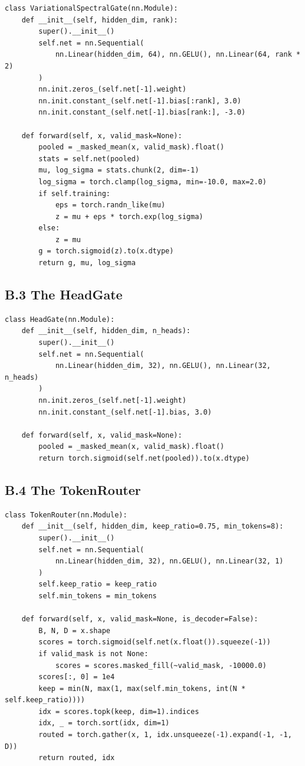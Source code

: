 \begin{lstlisting}
class VariationalSpectralGate(nn.Module):
    def __init__(self, hidden_dim, rank):
        super().__init__()
        self.net = nn.Sequential(
            nn.Linear(hidden_dim, 64), nn.GELU(), nn.Linear(64, rank * 2)
        )
        nn.init.zeros_(self.net[-1].weight)
        nn.init.constant_(self.net[-1].bias[:rank], 3.0)
        nn.init.constant_(self.net[-1].bias[rank:], -3.0)
    
    def forward(self, x, valid_mask=None):
        pooled = _masked_mean(x, valid_mask).float()
        stats = self.net(pooled)
        mu, log_sigma = stats.chunk(2, dim=-1)
        log_sigma = torch.clamp(log_sigma, min=-10.0, max=2.0)
        if self.training:
            eps = torch.randn_like(mu)
            z = mu + eps * torch.exp(log_sigma)
        else:
            z = mu
        g = torch.sigmoid(z).to(x.dtype)
        return g, mu, log_sigma
\end{lstlisting}

\subsection{B.3 The HeadGate}

\begin{lstlisting}
class HeadGate(nn.Module):
    def __init__(self, hidden_dim, n_heads):
        super().__init__()
        self.net = nn.Sequential(
            nn.Linear(hidden_dim, 32), nn.GELU(), nn.Linear(32, n_heads)
        )
        nn.init.zeros_(self.net[-1].weight)
        nn.init.constant_(self.net[-1].bias, 3.0)
    
    def forward(self, x, valid_mask=None):
        pooled = _masked_mean(x, valid_mask).float()
        return torch.sigmoid(self.net(pooled)).to(x.dtype)
\end{lstlisting}

\subsection{B.4 The TokenRouter}

\begin{lstlisting}
class TokenRouter(nn.Module):
    def __init__(self, hidden_dim, keep_ratio=0.75, min_tokens=8):
        super().__init__()
        self.net = nn.Sequential(
            nn.Linear(hidden_dim, 32), nn.GELU(), nn.Linear(32, 1)
        )
        self.keep_ratio = keep_ratio
        self.min_tokens = min_tokens
    
    def forward(self, x, valid_mask=None, is_decoder=False):
        B, N, D = x.shape
        scores = torch.sigmoid(self.net(x.float()).squeeze(-1))
        if valid_mask is not None:
            scores = scores.masked_fill(~valid_mask, -10000.0)
        scores[:, 0] = 1e4
        keep = min(N, max(1, max(self.min_tokens, int(N * self.keep_ratio))))
        idx = scores.topk(keep, dim=1).indices
        idx, _ = torch.sort(idx, dim=1)
        routed = torch.gather(x, 1, idx.unsqueeze(-1).expand(-1, -1, D))
        return routed, idx
\end{lstlisting}

